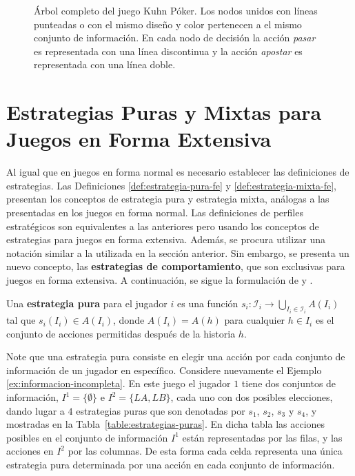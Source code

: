 \begin{figure}[h]
\begin{center}
\end{center}
\caption{Árbol completo del juego Kuhn Póker. Los nodos unidos con líneas punteadas o con el mismo diseño y color pertenecen a el mismo conjunto de información. En cada nodo de decisión la acción \textit{pasar} es representada con una línea discontinua y la acción \textit{apostar} es representada con una línea doble.}
\label{fig:kuhn-poker}
\end{figure}

\section{Estrategias Puras y Mixtas para Juegos en Forma Extensiva}

Al igual que en juegos en forma normal es necesario establecer las definiciones de estrategias. Las Definiciones \ref{def:estrategia-pura-fe} y \ref{def:estrategia-mixta-fe}, presentan los conceptos de estrategia pura y estrategia mixta, análogas a las presentadas en los juegos en forma normal. Las definiciones de perfiles estratégicos son equivalentes a las anteriores pero usando los conceptos de estrategias para juegos en forma extensiva. Además, se procura utilizar una notación similar a la utilizada en la sección anterior. Sin embargo, se presenta un nuevo concepto, las \textbf{estrategias de comportamiento}, que son exclusivas para juegos en forma extensiva. A continuación, se sigue la formulación de \cite{bib:conceptos-basicos} y \cite{bib:course-game-theory}.

\begin{definition}
\label{def:estrategia-pura-fe}
Una \textbf{estrategia pura} para el jugador $i$ es una función $s_i : \mathcal{I}_i \rightarrow \bigcup_{I_i \in \mathcal{I}_i}A(I_i)$ tal que $s_i(I_i) \in A(I_i)$, donde $A(I_i) = A(h)$ para cualquier $h \in I_i$ es el conjunto de acciones permitidas después de la historia $h$. 
\end{definition}

Note que una estrategia pura consiste en elegir una acción por cada conjunto de información de un jugador en específico. Considere nuevamente el Ejemplo \ref{ex:informacion-incompleta}. En este juego el jugador $1$ tiene dos conjuntos de información, $I^1 = \{\emptyset\}$ e $I^2 = \{LA, LB\}$, cada uno con dos posibles elecciones, dando lugar a $4$ estrategias puras que son denotadas por $s_1$, $s_2$, $s_3$ y $s_4$, y mostradas en la Tabla~\ref{table:estrategias-puras}. En dicha tabla las acciones posibles en el conjunto de información $I^1$ están representadas por las filas, y las acciones en $I^2$ por las columnas. De esta forma cada celda representa una única estrategia pura determinada por una acción en cada conjunto de información.

